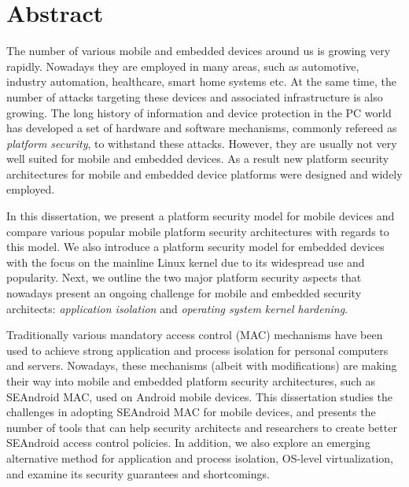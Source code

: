 

\section*{Abstract}

The number of various mobile and embedded devices around us is growing very rapidly. Nowadays they are employed in many areas, such as automotive, industry automation, healthcare, smart home systems etc. At the same time, the number of attacks targeting these devices and associated infrastructure is also growing. The long history of information and device protection in the PC world has developed a set of hardware and software mechanisms, commonly refereed as \textit{platform security}, to withstand these attacks. However, they are usually not very well suited for mobile and embedded devices. As a result new platform security architectures for mobile and embedded device platforms were designed and widely employed. 

In this dissertation, we present a platform security model for mobile devices and compare various popular mobile platform security architectures with regards to this model. We also introduce a platform security model for embedded devices with the focus on the mainline Linux kernel due to its widespread use and popularity. Next, we outline the two major platform security aspects that nowadays present an ongoing challenge for mobile and embedded security architects: \textit{application isolation} and \textit{operating system kernel hardening}.   

Traditionally various mandatory access control (MAC) mechanisms have been used to achieve strong application and process isolation for personal computers and servers. Nowadays, these mechanisms (albeit with modifications) are making their way into mobile and embedded platform security architectures, such as SEAndroid MAC, used on Android mobile devices. This dissertation studies the challenges in adopting SEAndroid MAC for mobile devices, and presents the number of tools that can help security architects and researchers to create better SEAndroid access control policies. In addition, we also explore an emerging alternative method for application and process isolation, OS-level virtualization, and examine its security guarantees and shortcomings. 

